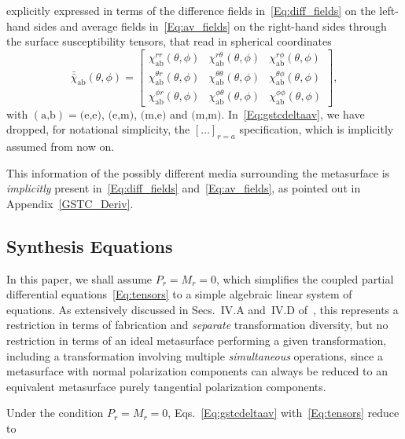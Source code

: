 \documentclass[journal,transaction]{IEEEtran}
\begin{document}
%
explicitly expressed in terms of the difference fields in~\eqref{Eq:diff_fields} on the left-hand sides and average fields in~\eqref{Eq:av_fields} on the right-hand sides through the surface susceptibility tensors, that read in spherical coordinates
%
\begin{equation}\label{Eq:tensors}
\bar{\bar{\chi}}_\text{ab}(\theta,\phi)=
\begin{bmatrix}
  \chi^{r r}_\text{ab}(\theta,\phi)& \chi^{r \theta}_\text{ab}(\theta,\phi)&\chi^{r \phi}_\text{ab}(\theta,\phi)\\
  \chi^{\theta r}_\text{ab}(\theta,\phi)& \chi^{\theta \theta}_\text{ab}(\theta,\phi)&\chi^{\theta \phi}_\text{ab}(\theta,\phi)\\
  \chi^{\phi r}_\text{ab}(\theta,\phi)& \chi^{\phi \theta}_\text{ab}(\theta,\phi)&\chi^{\phi \phi}_\text{ab}(\theta,\phi)
  \end{bmatrix},
\end{equation}
%
with $(\text{a,b})=\text{(e,e)}$, $\text{(e,m)}$, $\text{(m,e)}$ and $\text{(m,m)}$. In~\eqref{Eq:gstcdeltaav}, we have dropped, for notational simplicity, the $[\ldots]_{r=a}$ specification, which is implicitly assumed from now on.

This information of the possibly different media surrounding the metasurface is \emph{implicitly} present in~\eqref{Eq:diff_fields} and~\eqref{Eq:av_fields}, as pointed out in Appendix~\ref{GSTC_Deriv}.

\subsection{Synthesis Equations}

In this paper, we shall assume $P_r=M_r=0$, which simplifies the coupled partial differential equations~\eqref{Eq:tensors} to a simple algebraic linear system of equations. As extensively discussed in Secs.~IV.A and~IV.D of~\cite{2017_12_Achouri_Nanophotonics}, this represents a restriction in terms of fabrication and \emph{separate} transformation diversity, but no restriction in terms of an ideal metasurface performing a given transformation, including a transformation involving multiple \emph{simultaneous} operations, since a metasurface with normal polarization components can always be reduced to an equivalent metasurface purely tangential polarization components.

Under the condition $P_r=M_r=0$, Eqs.~\eqref{Eq:gstcdeltaav} with~\eqref{Eq:tensors} reduce to
\end{document}
